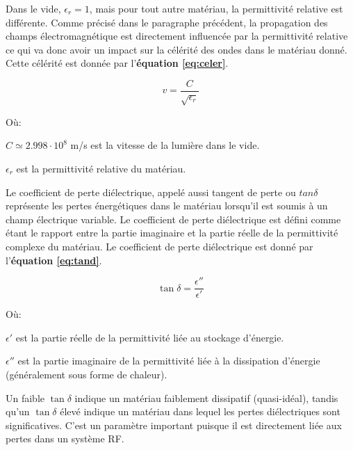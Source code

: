 \documentclass[12pt]{article}
\begin{document}
\vspace{0.5cm}
Dans le vide, $\epsilon_r = 1$, mais pour tout autre matériau, la permittivité relative est différente. Comme précisé dans le paragraphe précédent, la propagation des champs électromagnétique est directement influencée par la permittivité relative ce qui va donc avoir un impact sur la célérité des ondes dans le matériau donné. Cette célérité est donnée par l'\textbf{équation \ref{eq:celer}}.

\vspace{0.5cm}
{\Large
\begin{equation}
v = \frac{C}{\sqrt{\epsilon_r}} 
\label{eq:celer}
\end{equation}}

\vspace{0.5cm}
Où: 

$C \simeq 2.998 \cdot 10^8$ m/s est la vitesse de la lumière dans le vide. 

$\epsilon_r$ est la permittivité relative du matériau. 

\vspace{1cm}
Le coefficient de perte diélectrique, appelé aussi tangent de perte ou $tan\delta$ représente les pertes énergétiques dans le matériau lorsqu'il est soumis à un champ électrique variable. Le coefficient de perte diélectrique est défini comme étant le rapport entre la partie imaginaire et la partie réelle de la permittivité complexe du matériau. Le coefficient de perte diélectrique est donné par l'\textbf{équation \ref{eq:tand}}.

\vspace{0.5cm}
{\Large
\begin{equation}
\tan\delta = \frac{\epsilon''}{\epsilon'} 
\label{eq:tand}
\end{equation}}

\vspace{0.5cm}
Où: 

$\epsilon'$ est la partie réelle de la permittivité liée au stockage d’énergie. 

$\epsilon''$ est la partie imaginaire de la permittivité liée à la dissipation d’énergie (généralement sous forme de chaleur). 

\vspace{0.5cm}
Un faible $\tan\delta$ indique un matériau faiblement dissipatif (quasi-idéal), tandis qu’un $\tan\delta$ élevé indique un matériau dans lequel les pertes diélectriques sont significatives. C'est un paramètre important puisque il est directement liée aux pertes dans un système RF.
\end{document}
